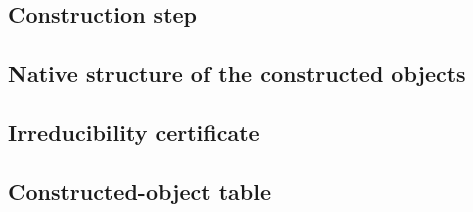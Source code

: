\subsection{Construction step}\label{subsec:construction-step}


\subsection{Native structure of the constructed objects}\label{subsec:native-structure}


\subsection{Irreducibility certificate}\label{subsec:irreducibility-certificate}


\subsection{Constructed-object table}\label{subsec:constructed-object-table}

% 
